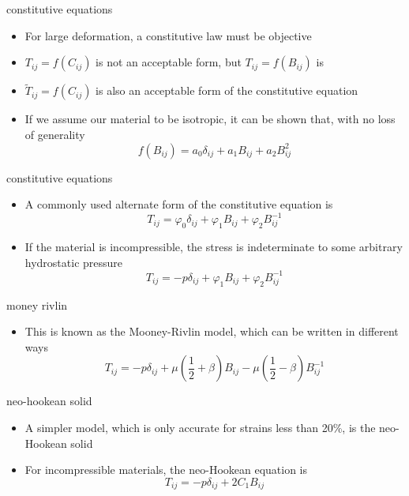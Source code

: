 \documentclass[
  letterpaper,
  ignorenonframetext,
  aspectratio=43,
  handout,
  12pt]{beamer}
\providecommand{\tightlist}{%
  \setlength{\itemsep}{0pt}\setlength{\parskip}{0pt}}
\providecommand{\tightlist}{%
\setlength{\itemsep}{0pt}\setlength{\parskip}{0pt}}
\begin{document}
\begin{frame}{constitutive equations}
\protect\hypertarget{constitutive-equations}{}
\begin{itemize}
\tightlist
\item
  For large deformation, a constitutive law must be objective
\item
  \(T_{ij} = f(C_{ij})\) is not an acceptable form, but
  \(T_{ij} = f(B_{ij})\) is
\item
  \(\tilde{T}_{ij} = f(C_{ij})\) is also an acceptable form of the
  constitutive equation
\item
  If we assume our material to be isotropic, it can be shown that, with
  no loss of generality
  \[f(B_{ij}) = a_0 \delta_{ij} + a_1 B_{ij} + a_2 B_{ij}^2\]
\end{itemize}
\end{frame}

\begin{frame}{constitutive equations}
\protect\hypertarget{constitutive-equations-1}{}
\begin{itemize}
\item
  A commonly used alternate form of the constitutive equation is
  \[T_{ij} = \varphi_0 \delta_{ij} + \varphi_1 B_{ij} + \varphi_2 B_{ij}^{-1}\]
\item
  If the material is incompressible, the stress is indeterminate to some
  arbitrary hydrostatic pressure
  \[T_{ij} = -p \delta_{ij} + \varphi_1 B_{ij} + \varphi_2 B_{ij}^{-1}\]
\end{itemize}
\end{frame}

\begin{frame}{money rivlin}
\protect\hypertarget{money-rivlin}{}
\begin{itemize}
\tightlist
\item
  This is known as the Mooney-Rivlin model, which can be written in
  different ways
  \[T_{ij} = -p \delta_{ij} + \mu \left(\frac{1}{2} + \beta\right) B_{ij} - \mu \left(\frac{1}{2} - \beta\right) B_{ij}^{-1}\]
\end{itemize}
\end{frame}

\begin{frame}{neo-hookean solid}
\protect\hypertarget{neo-hookean-solid}{}
\begin{itemize}
\tightlist
\item
  A simpler model, which is only accurate for strains less than 20\%, is
  the neo-Hookean solid
\item
  For incompressible materials, the neo-Hookean equation is
  \[T_{ij} = -p \delta_{ij} + 2C_1 B_{ij}\]
\end{itemize}
\end{frame}
\end{document}
